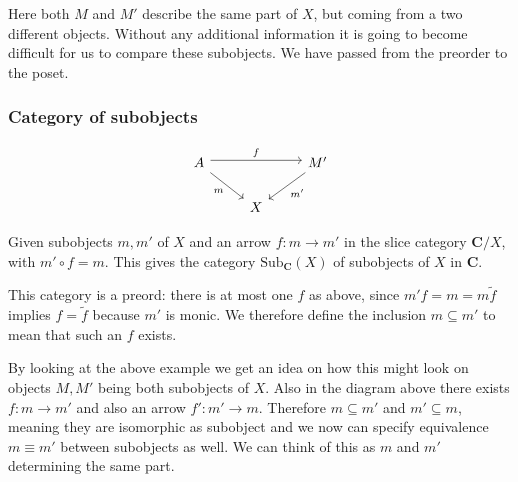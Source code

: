 \documentclass[11pt]{article}
\begin{document}
Here both $M$ and $M'$ describe the same part of $X$, but coming from a two
different objects. Without any additional information it is going to become
difficult for us to compare these subobjects. We have passed from the preorder
to the poset.

\subsubsection{Category of subobjects}

\[
\begin{tikzcd}
  A \ar[rr, "f", shift left] \ar[dr, "m"'] & & M' \ar[dl, "m'"] \\
                                           & X &
\end{tikzcd}
\]

Given subobjects $m, m'$ of $X$ and an arrow $f: m \rightarrow m'$ in the slice
category $\mathbf{C} / X$, with $m' \circ f = m$. This gives the category
$\text{Sub}_{\mathbf{C}}(X)$ of subobjects of $X$ in $\mathbf{C}$.

This category is a preord: there is at most one $f$ as above, since $m'f = m =
m \tilde{f}$ implies $f = \tilde{f}$ because $m'$ is monic. We therefore define
the inclusion $m \subseteq m'$ to mean that such an $f$ exists.

\begin{center}
\end{center}

By looking at the above example we get an idea on how this might look on
objects $M, M'$ being both subobjects of $X$. Also in the diagram above there
exists $f: m \rightarrow m'$ and also an arrow $f': m' \rightarrow m$.
Therefore $m \subseteq m'$ and $m' \subseteq m$, meaning they are isomorphic as
subobject and we now can specify equivalence $m \equiv m'$ between subobjects
as well. We can think of this as $m$ and $m'$ determining the same part.
\end{document}
